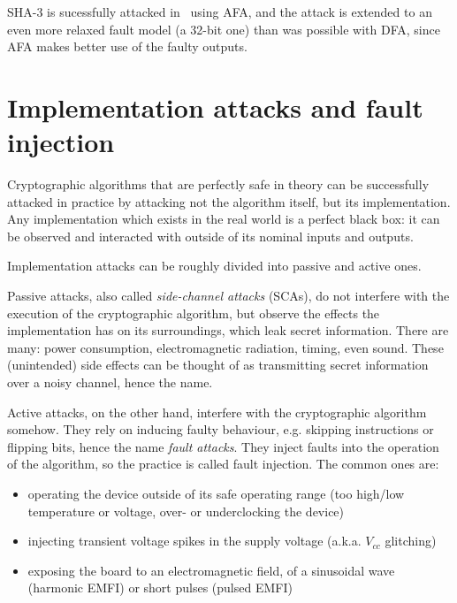\documentclass[times, utf8, diplomski]{fer}
\begin{document}
SHA-3 is sucessfully attacked in~\cite{luo2018algebraic} using AFA, and the
attack is extended to an even more relaxed fault model (a 32-bit one) than
was possible with DFA, since AFA makes better use of the faulty outputs.



\section{Implementation attacks and fault injection}
Cryptographic algorithms that are perfectly safe in theory can be successfully
attacked in practice by attacking not the algorithm itself, but its implementation.
Any implementation which exists in the real world is a perfect black box: it can
be observed and interacted with outside of its nominal inputs and outputs.

Implementation attacks can be roughly divided into passive and active ones.

Passive attacks, also called \emph{side-channel attacks} (SCAs), do not interfere
with the execution of the cryptographic algorithm, but observe the effects the
implementation has on its surroundings, which leak secret information.
There are many: power consumption, electromagnetic radiation, timing, even sound. %
These (unintended) side effects can be thought of as transmitting secret
information over a noisy channel, hence the name.

Active attacks, on the other hand, interfere with the cryptographic algorithm
somehow. They rely on inducing faulty behaviour, e.g. skipping instructions or
flipping bits, hence the name \emph{fault attacks}. They inject faults into the
operation of the algorithm, so the practice is called fault injection.
The common ones are:
\begin{itemize}
  \item operating the device outside of its safe operating range
        (too high/low temperature or voltage, over- or underclocking the device)
  \item injecting transient voltage spikes in the supply voltage (a.k.a. $V_{cc}$ glitching)
  \item exposing the board to an electromagnetic field, of a sinusoidal wave (harmonic EMFI)
        or short pulses (pulsed EMFI)
\end{itemize}

\end{document}
